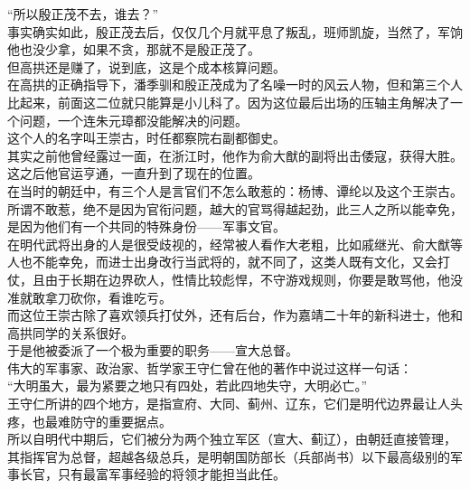 \begin{multicols}{\theparacolNo}
“所以殷正茂不去，谁去？”\\

事实确实如此，殷正茂去后，仅仅几个月就平息了叛乱，班师凯旋，当然了，军饷他也没少拿，如果不贪，那就不是殷正茂了。\\

但高拱还是赚了，说到底，这是个成本核算问题。\\

在高拱的正确指导下，潘季驯和殷正茂成为了名噪一时的风云人物，但和第三个人比起来，前面这二位就只能算是小儿科了。因为这位最后出场的压轴主角解决了一个问题，一个连朱元璋都没能解决的问题。\\

这个人的名字叫王崇古，时任都察院右副都御史。\\

其实之前他曾经露过一面，在浙江时，他作为俞大猷的副将出击倭寇，获得大胜。这之后他官运亨通，一直升到了现在的位置。\\

在当时的朝廷中，有三个人是言官们不怎么敢惹的：杨博、谭纶以及这个王崇古。\\

所谓不敢惹，绝不是因为官衔问题，越大的官骂得越起劲，此三人之所以能幸免，是因为他们有一个共同的特殊身份——军事文官。\\

在明代武将出身的人是很受歧视的，经常被人看作大老粗，比如戚继光、俞大猷等人也不能幸免，而进士出身改行当武将的，就不同了，这类人既有文化，又会打仗，且由于长期在边界砍人，性情比较彪悍，不守游戏规则，你要是敢骂他，他没准就敢拿刀砍你，看谁吃亏。\\

而这位王崇古除了喜欢领兵打仗外，还有后台，作为嘉靖二十年的新科进士，他和高拱同学的关系很好。\\

于是他被委派了一个极为重要的职务——宣大总督。\\

伟大的军事家、政治家、哲学家王守仁曾在他的著作中说过这样一句话：\\

“大明虽大，最为紧要之地只有四处，若此四地失守，大明必亡。”\\

王守仁所讲的四个地方，是指宣府、大同、蓟州、辽东，它们是明代边界最让人头疼，也最难防守的重要据点。\\

所以自明代中期后，它们被分为两个独立军区（宣大、蓟辽），由朝廷直接管理，其指挥官为总督，超越各级总兵，是明朝国防部长（兵部尚书）以下最高级别的军事长官，只有最富军事经验的将领才能担当此任。\\


\end{multicols}
